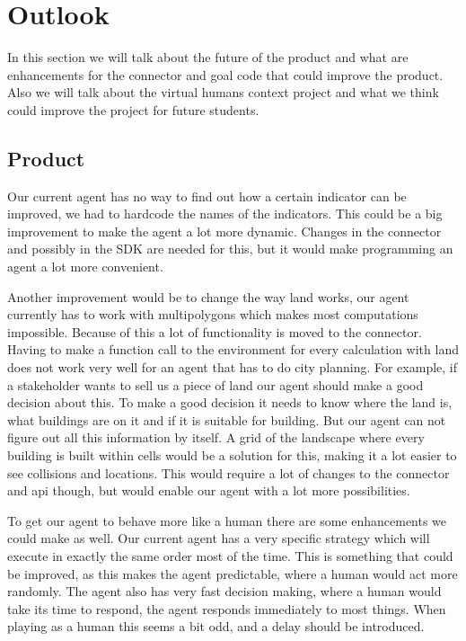 \chapter{Outlook}
In this section we will talk about the future of the product and what are enhancements for the connector and goal code that could improve the product. Also we will talk about the virtual humans context project and what we think could improve the project for future students.

\section {Product}
Our current agent has no way to find out how a certain indicator can be improved, we had to hardcode the names of the indicators. This could be a big improvement to make the agent a lot more dynamic. Changes in the connector and possibly in the SDK are needed for this, but it would make programming an agent a lot more convenient.

Another improvement would be to change the way land works, our agent currently has to work with multipolygons which makes most computations impossible. Because of this a lot of functionality is moved to the connector. Having to make a function call to the environment for every calculation with land does not work very well for an agent that has to do city planning. For example, if a stakeholder wants to sell us a piece of land our agent should make a good decision about this. To make a good decision it needs to know where the land is, what buildings are on it and if it is suitable for building. But our agent can not figure out all this information by itself. A grid of the landscape where every building is built within cells would be a solution for this, making it a lot easier to see collisions and locations. This would require a lot of changes to the connector and api though, but would enable our agent with a lot more possibilities.

To get our agent to behave more like a human there are some enhancements we could make as well. Our current agent has a very specific strategy which will execute in exactly the same order most of the time. This is something that could be improved, as this makes the agent predictable, where a human would act more randomly. The agent also has very fast decision making, where a human would take its time to respond, the agent responds immediately to most things. When playing as a human this seems a bit odd, and a delay should be introduced.
